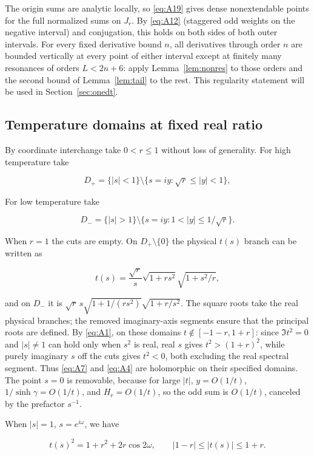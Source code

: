 \documentclass[11pt,a4paper]{article}
\numberwithin{equation}{section}
\theoremstyle{plain}
\theoremstyle{definition}
\begin{document}
The origin sums are analytic locally, so \eqref{eq:A19} gives dense nonextendable points for the full normalized sums on $J_r$. By \eqref{eq:A12} (staggered odd weights on the negative interval) and conjugation, this holds on both sides of both outer intervals. For every fixed derivative bound $n$, all derivatives through order $n$ are bounded vertically at every point of either interval except at finitely many resonances of orders $L<2n+6$: apply Lemma~\ref{lem:nonres} to those orders and the second bound of Lemma~\ref{lem:tail} to the rest. This regularity statement will be used in Section~\ref{sec:onedt}.

\subsection{Temperature domains at fixed real ratio}\label{sec:fixeds} By coordinate interchange take \(0<r\le1\) without loss of generality. For high temperature take

\[D_+=\{|s|<1\}\setminus\{s=iy:\sqrt r\le |y|<1\},\]

For low temperature take

\[D_-=\{|s|>1\}\setminus\{s=iy:1<|y|\le1/\sqrt r\}.\]

When \(r=1\) the cuts are empty. On \(D_+\setminus\{0\}\) the physical \(t(s)\) branch can be written as

\[t(s)=\frac{\sqrt r}{s}\sqrt{1+rs^2}\sqrt{1+s^2/r},\]

and on \(D_-\) it is \(\sqrt r\,s\sqrt{1+1/(rs^2)}\sqrt{1+r/s^2}\). The square roots take the real physical branches; the removed imaginary-axis segments ensure that the principal roots are defined. By \eqref{eq:A1}, on these domains \(t\notin[-1-r,1+r]\): since \(\Im t^2=0\) and \(|s|\ne1\) can hold only when \(s^2\) is real, real \(s\) gives \(t^2>(1+r)^2\), while purely imaginary \(s\) off the cuts gives \(t^2<0\), both excluding the real spectral segment. Thus \eqref{eq:A7} and \eqref{eq:A4} are holomorphic on their specified domains. The point \(s=0\) is removable, because for large \(|t|\), \(y=O(1/t)\), \(1/\sinh\gamma=O(1/t)\), and \(H_r=O(1/t)\), so the odd sum is \(O(1/t)\), canceled by the prefactor \(s^{-1}\).

When \(|s|=1\), \(s=e^{i\omega}\), we have

\begin{equation}
t(s)^2=1+r^2+2r\cos 2\omega,\qquad |1-r|\le |t(s)|\le1+r.
\label{eq:A20}
\end{equation}
\end{document}
